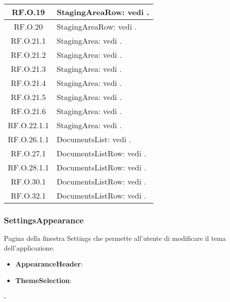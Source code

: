 \documentclass[10pt, a4paper]{article}
\begin{document}
\begin{xltabular}{\textwidth}{c|X}
\hline
RF.O.19 & StagingAreaRow: vedi . \\ %
\hline
RF.O.20 & StagingAreaRow: vedi . \\  %
\hline
RF.O.21.1 & StagingArea: vedi .\\%
\hline
RF.O.21.2 & StagingArea: vedi .\\%
\hline
RF.O.21.3 &  StagingArea: vedi .\\ %
\hline
RF.O.21.4 &  StagingArea: vedi .\\%
\hline
RF.O.21.5 & StagingArea: vedi .\\ %
\hline
RF.O.21.6 & StagingArea: vedi .\\%
\hline
RF.O.22.1.1 & StagingArea: vedi .\\%
\hline
RF.O.26.1.1  & DocumentsList: vedi .\\%
\hline
RF.O.27.1 &  DocumentsListRow: vedi .\\%
\hline
RF.O.28.1.1 & DocumentsListRow: vedi . \\%
\hline
RF.O.30.1 & DocumentsListRow: vedi . \\ %
\hline
RF.O.32.1 & DocumentsListRow: vedi .\\%
\end{xltabular}



\subsubsection{SettingsAppearance}
Pagina della finestra Settings che permette all'utente di modificare il tema dell'applicazione.
\begin{itemize}
    \item \label{AppearanceHeader}\textbf{AppearanceHeader}:
    \item \label{ThemeSelection}\textbf{ThemeSelection}:
\end{itemize}
 -
\end{document}
